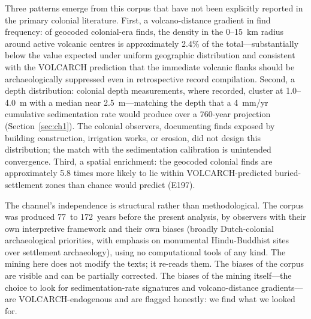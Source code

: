 \documentclass[12pt,a4paper]{article}
\begin{document}
Three patterns emerge from this corpus that have not been explicitly reported in the primary colonial literature. First, a volcano-distance gradient in find frequency: of geocoded colonial-era finds, the density in the 0--15~km radius around active volcanic centres is approximately 2.4\% of the total---substantially below the value expected under uniform geographic distribution and consistent with the VOLCARCH prediction that the immediate volcanic flanks should be archaeologically suppressed even in retrospective record compilation. Second, a depth distribution: colonial depth measurements, where recorded, cluster at 1.0--4.0~m with a median near 2.5~m---matching the depth that a 4~mm/yr cumulative sedimentation rate would produce over a 760-year projection (Section~\ref{sec:ch1}). The colonial observers, documenting finds exposed by building construction, irrigation works, or erosion, did not design this distribution; the match with the sedimentation calibration is unintended convergence. Third, a spatial enrichment: the geocoded colonial finds are approximately 5.8 times more likely to lie within VOLCARCH-predicted buried-settlement zones than chance would predict (E197).

The channel's independence is structural rather than methodological. The corpus was produced 77~to 172~years before the present analysis, by observers with their own interpretive framework and their own biases (broadly Dutch-colonial archaeological priorities, with emphasis on monumental Hindu-Buddhist sites over settlement archaeology), using no computational tools of any kind. The mining here does not modify the texts; it re-reads them. The biases of the corpus are visible and can be partially corrected. The biases of the mining itself---the choice to look for sedimentation-rate signatures and volcano-distance gradients---are VOLCARCH-endogenous and are flagged honestly: we find what we looked for.
\end{document}
